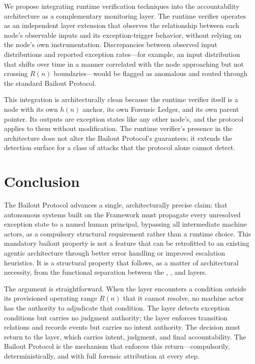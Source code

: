 We propose integrating runtime verification techniques into the \bxthree{} accountability architecture as a complementary monitoring layer. The runtime verifier operates as an independent \fact{} layer extension that observes the relationship between each node's observable inputs and its exception-trigger behavior, without relying on the node's own instrumentation. Discrepancies between observed input distributions and reported exception rates---for example, an input distribution that shifts over time in a manner correlated with the node approaching but not crossing $R(n)$ boundaries---would be flagged as anomalous and routed through the standard Bailout Protocol.

This integration is architecturally clean because the runtime verifier itself is a \bxthree{} node with its own $h(n)$ anchor, its own Forensic Ledger, and its own parent pointer. Its outputs are exception states like any other node's, and the protocol applies to them without modification. The runtime verifier's presence in the architecture does not alter the Bailout Protocol's guarantees; it extends the detection surface for a class of attacks that the protocol alone cannot detect.

\section{Conclusion}
\label{sec:conclusion}

The Bailout Protocol advances a single, architecturally precise claim: that autonomous systems built on the \bxthree{} Framework must propagate every unresolved exception state to a named human principal, bypassing all intermediate machine actors, as a compulsory structural requirement rather than a runtime choice. This mandatory bailout property is not a feature that can be retrofitted to an existing agentic architecture through better error handling or improved escalation heuristics. It is a structural property that follows, as a matter of architectural necessity, from the functional separation between the \purpose{}, \bounds{}, and \fact{} layers.

The argument is straightforward. When the \bounds{} layer encounters a condition outside its provisioned operating range $R(n)$ that it cannot resolve, no machine actor has the authority to adjudicate that condition. The \bounds{} layer detects exception conditions but carries no judgment authority; the \fact{} layer enforces transition relations and records events but carries no intent authority. The decision must return to the \purpose{} layer, which carries intent, judgment, and final accountability. The Bailout Protocol is the mechanism that enforces this return---compulsorily, deterministically, and with full forensic attribution at every step.

